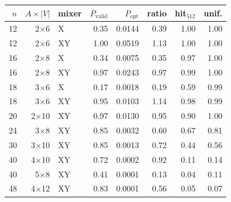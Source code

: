 \begin{tabular}{rrlrrrrr}
\toprule
$n$ & $A{\times}|V|$ & mixer & $P_\text{valid}$ & $P_\text{opt}$ & ratio & hit$_{512}$ & unif. \\
\midrule
12 & 2$\times$6 & X & 0.35 & 0.0144 & 0.39 & 1.00 & 1.00 \\
12 & 2$\times$6 & XY & 1.00 & 0.0519 & 1.13 & 1.00 & 1.00 \\
16 & 2$\times$8 & X & 0.34 & 0.0075 & 0.35 & 0.97 & 1.00 \\
16 & 2$\times$8 & XY & 0.97 & 0.0243 & 0.97 & 0.99 & 1.00 \\
18 & 3$\times$6 & X & 0.17 & 0.0018 & 0.19 & 0.59 & 0.99 \\
18 & 3$\times$6 & XY & 0.95 & 0.0103 & 1.14 & 0.98 & 0.99 \\
20 & 2$\times$10 & XY & 0.97 & 0.0130 & 0.95 & 0.90 & 1.00 \\
24 & 3$\times$8 & XY & 0.85 & 0.0032 & 0.60 & 0.67 & 0.81 \\
30 & 3$\times$10 & XY & 0.85 & 0.0013 & 0.72 & 0.44 & 0.56 \\
40 & 4$\times$10 & XY & 0.72 & 0.0002 & 0.92 & 0.11 & 0.14 \\
40 & 5$\times$8 & XY & 0.41 & 0.0001 & 0.13 & 0.04 & 0.11 \\
48 & 4$\times$12 & XY & 0.83 & 0.0001 & 0.56 & 0.05 & 0.07 \\
\bottomrule
\end{tabular}
